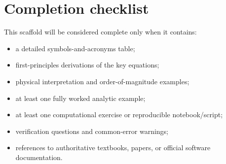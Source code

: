 \documentclass[11pt]{article}
\begin{document}
\section{Completion checklist}
This scaffold will be considered complete only when it contains:
\begin{itemize}[leftmargin=1.6em]
\item a detailed symbols-and-acronyms table;
\item first-principles derivations of the key equations;
\item physical interpretation and order-of-magnitude examples;
\item at least one fully worked analytic example;
\item at least one computational exercise or reproducible notebook/script;
\item verification questions and common-error warnings;
\item references to authoritative textbooks, papers, or official software documentation.
\end{itemize}
\end{document}
